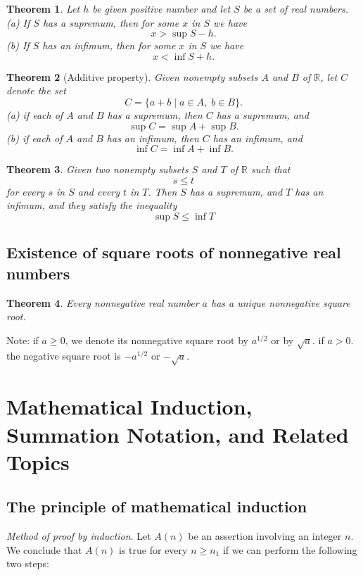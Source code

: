 \documentclass{article}
\newtheorem{theorem}{Theorem}[section]
\begin{document}
\begin{theorem}
Let \(h\) be given positive number and let \(S\) be a set of real numbers. \\
(a) If \(S\) has a supremum, then for some \(x\) in \(S\) we have
\[
x > \sup S - h.
\]
(b) If \(S\) has an infimum, then for some \(x\) in \(S\) we have
\[
x < \inf S + h.
\]
\end{theorem}

\begin{theorem}[Additive property]
Given nonempty subsets \(A\) and \(B\) of \(\mathbb{R}\), let \(C\) denote the set
\[
C = \{a + b \;|\; a \in A,\; b \in B\}.
\]
(a) if each of \(A\) and \(B\) has a supremum, then \(C\) has a supremum, and
\[
\sup C = \sup A + \sup B.
\]
(b) if each of \(A\) and \(B\) has an infimum, then \(C\) has an infimum, and
\[
\inf C = \inf A + \inf B.
\]
\end{theorem}

\begin{theorem}
Given two nonempty subsets \(S\) and \(T\) of \(\mathbb{R}\) such that
\[
s \leq t
\]
for every \(s\) in \(S\) and every \(t\) in \(T\). Then \(S\) has a supremum, and \(T\) has an infimum, and they satisfy the inequality
\[
\sup S \leq \inf T
\]
\end{theorem}

\subsection{Existence of square roots of nonnegative real numbers}

\begin{theorem}
    Every nonnegative real number \(a\) has a unique nonnegative square root.
\end{theorem}

Note: if \(a \geq 0\), we denote its nonnegative square root by \(a^{1/2}\) or by \(\sqrt{a}\). if \(a > 0\). the negative square root is \(-a^{1/2}\) or \(-\sqrt{a}\).

\section{Mathematical Induction, Summation Notation, and Related Topics}

\subsection{The principle of mathematical induction}

\emph{Method of proof by induction}. Let \(A(n)\) be an assertion involving an integer \(n\). We conclude that \(A(n)\) is true for every \(n \geq n_{1}\) if we can perform the following two steps:
\end{document}
